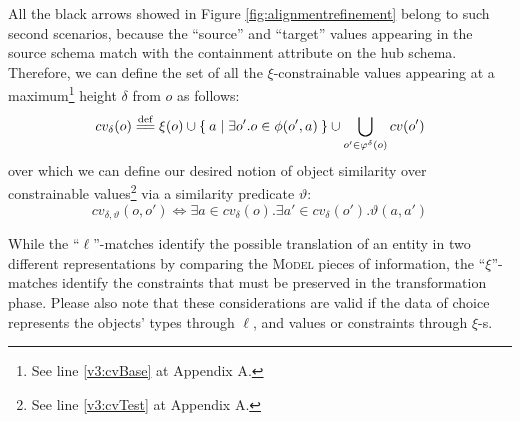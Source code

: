 \begin{example}[continues=ex:examplegraphdata,label=ex:examplereferencedOcaml]
All the black arrows showed in Figure \vref{fig:alignmentrefinement} belong to such second scenarios, because the ``source'' and ``target'' values appearing in the source schema match with the containment attribute on the hub schema. Therefore, we can define the set of all the $\xi$-constrainable values appearing at a maximum\footnote{See line \ref{v3:cvBase} at Appendix A.} height $\delta$ from $o$ as follows:
\[cv_\delta(o)\overset{\mathrm{def}}{=\mathrel{\mkern-3mu}=}\xi(o)\cup\Set{a|\exists o'. o\in\phi(o',a)}\cup\bigcup_{o'\in\varphi^\delta(o)}cv(o') \]
over which we can define our desired notion of object similarity over constrainable values\footnote{See line \ref{v3:cvTest} at Appendix A.} via a similarity predicate $\vartheta$:
\[cv_{\delta,\vartheta}(o,o')\Leftrightarrow \exists a\in cv_\delta(o).\exists a'\in cv_\delta(o').\vartheta(a,a')\]

While the ``$\ell$''-matches identify the possible translation of an entity in two different representations by comparing the \textsc{Model} pieces of information, the ``$\xi$''-matches identify the constraints that must be preserved in the transformation phase. Please also note that these considerations are valid if the data of choice represents the objects' types through $\ell$, and values or constraints through $\xi$-s.
\bigskip


\end{example}
